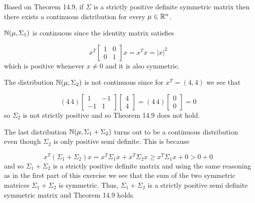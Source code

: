 
Based on Theorem 14.9, if $ \Sigma$ is a strictly positive definite symmetric matrix then there
exists a continuous distribution for every $ \mu \in \mathbb{R}^{n} $. 

$ \mathbb{N}(\mu, \Sigma_1)$ is continuous since the identity matrix satisfies

\[
    x^{T} \begin{bmatrix}
	1 & 0 \\
	0 & 1
    \end{bmatrix} x = x^{T} x = |x|^2
\] 
which is positive whenever $ x \neq 0$ and it is also symmetric.

The distribution $ \mathbb{N} (\mu, \Sigma_2)$ is not continuous since for $ x^{T}  = (4,4)$ we see that

\[
    (4 \, 4) \begin{bmatrix}
	1 & -1 \\
	-1 & 1
    \end{bmatrix} \begin{bmatrix}
    4 \\
    4
    \end{bmatrix} = (4 \, 4) \begin{bmatrix}
    0 \\
    0
    \end{bmatrix} = 0
\] 
so $ \Sigma_2$ is not strictly positive and so Theorem 14.9 does not hold.

The last distribution $ \mathbb{N}(\mu, \Sigma_1 + \Sigma_2)$ turns out to be a continuous distribution even
though $ \Sigma_2$ is only positive semi definite. This is because

\[
    x^{T} (\Sigma_1 + \Sigma_2) x = x^{T} \Sigma_1 x + x^{T} \Sigma_2 x \geq x^{T} \Sigma_1 x + 0 >
    0 + 0
\] 
and so $ \Sigma_1 + \Sigma_2$ is a strictly positive definite matrix and using the same reasoning as
in the first part of this exercise we see that the sum of the two 
symmetric matrices $ \Sigma_1 + \Sigma_2$ is symmetric. Thus, $ \Sigma_1 + \Sigma_2$ is a strictly
positive semi definite symmetric matrix and Theorem 14.9 holds.


